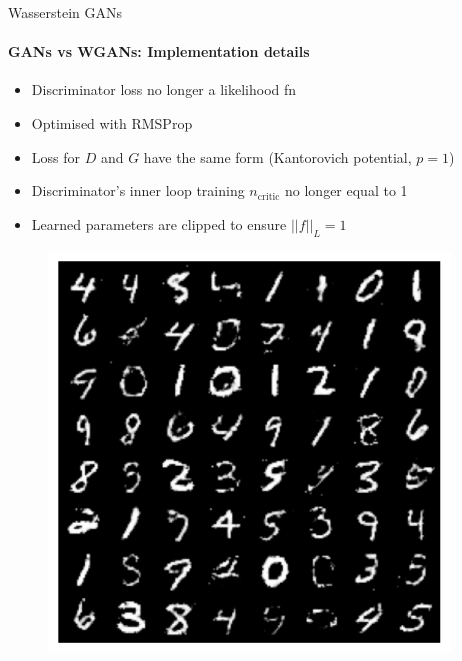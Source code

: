 \documentclass[pdf,aspectratio=169,10pt]{beamer}
\begin{document}
\begin{frame}{ Wasserstein GANs}
\framesubtitle{GANs vs WGANs: Implementation details}

\begin{minipage}{0.32\textwidth}
    \begin{itemize}
        \item Discriminator loss no longer a likelihood fn 
        \item Optimised with RMSProp
        \item Loss for $D$ and $G$ have the same form (Kantorovich potential, $p=1$)
        \item Discriminator's inner loop training $n_\text{critic}$ no longer equal to 1
        \item Learned parameters are clipped to ensure $||f||_L=1$
    \end{itemize}
\end{minipage}
\begin{minipage}{0.32\textwidth}
        \begin{figure}
        \centering
            \includegraphics[width=0.95\textwidth]{../img/gan_mnist.pdf}
            \centerline{}
        \end{figure}
\end{minipage}
\begin{minipage}{0.32\textwidth}
            \begin{figure}

\end{figure}
\end{minipage}
\end{frame}
\end{document}
